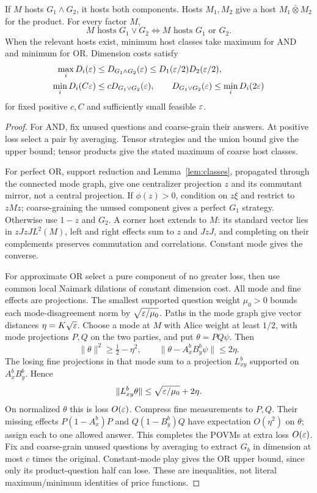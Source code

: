 \begin{proposition}\label{prop:boolean}
If $M$ hosts $G_1\wedge G_2$, it hosts both components. Hosts $M_1,M_2$ give a host $M_1\bar\otimes M_2$ for the product. For every factor $M$,
\[
 M\text{ hosts }G_1\vee G_2\iff
 M\text{ hosts }G_1\text{ or }G_2.
\]
When the relevant hosts exist, minimum host classes take maximum for AND and minimum for OR. Dimension costs satisfy
\begin{align*}
 \max_iD_i(\varepsilon)&\le D_{G_1\wedge G_2}(\varepsilon)
                  \le D_1(\varepsilon/2)D_2(\varepsilon/2),\\
 \min_iD_i(C\varepsilon)&\le cD_{G_1\vee G_2}(\varepsilon),\qquad
 D_{G_1\vee G_2}(\varepsilon)\le\min_iD_i(2\varepsilon)
\end{align*}
for fixed positive $c,C$ and sufficiently small feasible $\varepsilon$.
\end{proposition}
\begin{proof}
For AND, fix unused questions and coarse-grain their answers. At positive loss select a pair by averaging. Tensor strategies and the union bound give the upper bound; tensor products give the stated maximum of coarse host classes.

For perfect OR, support reduction and Lemma~\ref{lem:classes}, propagated through the connected mode graph, give one centralizer projection $z$ and its commutant mirror, not a central projection. If $\phi(z)>0$, condition on $z\xi$ and restrict to $zMz$; coarse-graining the unused component gives a perfect $G_1$ strategy. Otherwise use $1-z$ and $G_2$. A corner host extends to $M$: its standard vector lies in $zJzJL^2(M)$, left and right effects sum to $z$ and $JzJ$, and completing on their complements preserves commutation and correlations. Constant mode gives the converse.

For approximate OR select a pure component of no greater loss, then use common local Naimark dilations of constant dimension cost. All mode and fine effects are projections. The smallest supported question weight $\mu_0>0$ bounds each mode-disagreement norm by $\sqrt{\varepsilon/\mu_0}$. Paths in the mode graph give vector distances $\eta=K\sqrt{\varepsilon}$. Choose a mode at $M$ with Alice weight at least $1/2$, with mode projections $P,Q$ on the two parties, and put $\theta=PQ\psi$. Then
\[
 \|\theta\|^2\ge\tfrac12-\eta^2,\qquad
 \|\theta-A_x^bB_y^b\psi\|\le2\eta.
\]
The losing fine projections in that mode sum to a projection $L_{xy}^b$ supported on $A_x^bB_y^b$. Hence
\[
 \|L_{xy}^b\theta\|\le\sqrt{\varepsilon/\mu_0}+2\eta.
\]
On normalized $\theta$ this is loss $O(\varepsilon)$. Compress fine measurements to $P,Q$. Their missing effects $P(1-A_x^b)P$ and $Q(1-B_y^b)Q$ have expectation $O(\eta^2)$ on $\theta$; assign each to one allowed answer. This completes the POVMs at extra loss $O(\varepsilon)$. Fix and coarse-grain unused questions by averaging to extract $G_b$ in dimension at most $c$ times the original. Constant-mode play gives the OR upper bound, since only its product-question half can lose. These are inequalities, not literal maximum/minimum identities of price functions.
\end{proof}

